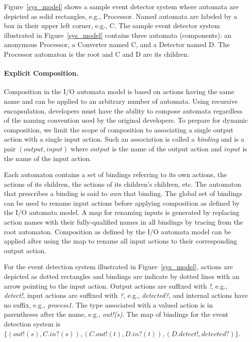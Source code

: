Figure~\ref{sys_model} shows a sample event detector system where automata are depicted as solid rectangles, e.g., Processor.
Named automata are labeled by a box in their upper left corner, e.g., C.
The sample event detector system illustrated in Figure~\ref{sys_model} contains three automata (components):  an anonymous Processor, a Converter named C, and a Detector named D.
The Processor automaton is the root and C and D are its children.

\paragraph{Explicit Composition.}
Composition in the I/O automata model is based on actions having the same name and can be applied to an arbitrary number of automata.
Using recursive encapsulation, developers must have the ability to compose automata regardless of the naming convention used by the original developers.
To prepare for dynamic composition, we limit the scope of composition to associating a single output action with a single input action.
Such an association is called a \emph{binding} and is a pair $(output, input)$ where $output$ is the name of the output action and $input$ is the name of the input action.

Each automaton contains a set of bindings referring to its own actions, the actions of its children, the actions of its children's children, etc.
The automaton that prescribes a binding is said to \emph{own} that binding.
The global set of bindings can be used to rename input actions before applying composition as defined by the I/O automata model.
A map for renaming inputs is generated by replacing action names with their fully-qualified names in all bindings by tracing from the root automaton.
Composition as defined by the I/O automata model can be applied after using the map to rename all input actions to their corresponding output action.

For the event detection system illustrated in Figure~\ref{sys_model}, actions are depicted as dotted rectangles and bindings are indicate by dotted lines with an arrow pointing to the input action.
Output actions are suffixed with \emph{!}, e.g., \emph{detect!}, input actions are suffixed with \emph{?}, e.g., \emph{detected?}, and internal actions have no suffix, e.g., \emph{process1}.
The type associated with a valued action is in parentheses after the name, e.g., \emph{out!(s)}.
The map of bindings for the event detection system is $\{ (out!(s), C.in?(s)), (C.out!(t), D.in?(t)), (D.detect!, detected?) \}$.

